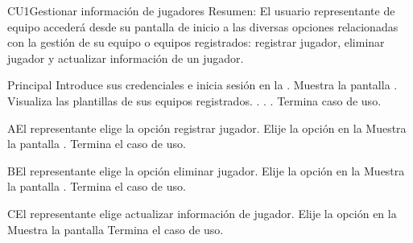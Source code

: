 
	\begin{UseCase}{CU1}{Gestionar información de jugadores}{
		Resumen: El usuario representante de equipo accederá desde su pantalla de inicio a las diversas opciones relacionadas con la gestión de su equipo o equipos registrados: registrar jugador, eliminar jugador y actualizar información de un jugador. }
	\end{UseCase}
	\newpage
	\begin{UCtrayectoria}{Principal}
	\UCpaso[\UCactor] Introduce sus credenciales e inicia sesión en la .	
	\UCpaso Muestra la pantalla .
	\UCpaso[\UCactor] Visualiza las plantillas de sus equipos registrados. . . .
	Termina caso de uso.
\end{UCtrayectoria}

	\begin{UCtrayectoriaA}{A}{El representante elige la opción registrar jugador.}
		\UCpaso[\UCactor] Elije la opción  en la %
		\UCpaso Muestra la pantalla .
		\UCpaso Termina el caso de uso.
	\end{UCtrayectoriaA}

	\begin{UCtrayectoriaA}{B}{El representante elige la opción eliminar jugador.}
		\UCpaso[\UCactor] Elije la opción  en la%
		\UCpaso Muestra la pantalla .
		\UCpaso Termina el caso de uso.
	\end{UCtrayectoriaA}
	
	\begin{UCtrayectoriaA}{C}{El representante elige actualizar información de jugador.}
		\UCpaso[\UCactor] Elije la opción  en la %
		\UCpaso Muestra la pantalla %
		\UCpaso Termina el caso de uso.
	\end{UCtrayectoriaA}

